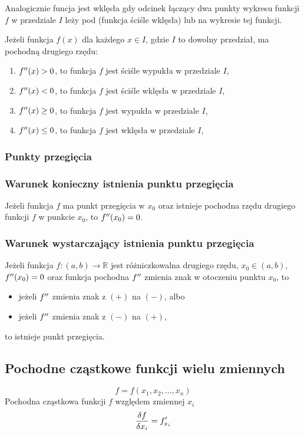 \documentclass[../Matematyka.tex]{subfiles}
\begin{document}
    Analogicznie funcja jest wklęsła gdy odcinek łączący dwa punkty wykresu funkcji \(f\) w przedziale \(I\) leży pod (funkcja ściśle wklęsła) lub na wykresie tej funkcji.

    Jeżeli funkcja \(f(x)\) dla każdego \(x \in I\), gdzie \(I\) to dowolny przedział, ma pochodną drugiego rzędu:
    \begin{enumerate}
        \item \(f^{\prime\prime}(x) > 0\), to funkcja \(f\) jest ściśle wypukła w przedziale \(I\),
        \item \(f^{\prime\prime}(x) < 0\), to funkcja \(f\) jest ściśle wklęsła w przedziale \(I\),
        \item \(f^{\prime\prime}(x) \geq 0\), to funkcja \(f\) jest wypukła w przedziale \(I\),
        \item \(f^{\prime\prime}(x) \leq 0\), to funkcja \(f\) jest wklęsła w przedziale \(I\),
    \end{enumerate}

    \subsubsection{Punkty przegięcia}
    \subsubsection*{Warunek konieczny istnienia punktu przegięcia}
    Jeżeli funkcja \(f\) ma punkt przegięcia w \(x_0\) oraz istnieje pochodna rzędu drugiego funkcji \(f\) w punkcie \(x_0\), to \(f^{\prime\prime}(x_0) = 0\).
    \subsubsection*{Warunek wystarczający istnienia punktu przegięcia}
    Jeżeli funkcja \(f:(a, b) \rightarrow \mathbb{R}\) jest różniczkowalna drugiego rzędu, \(x_0 \in (a,b)\), \(f^{\prime\prime}(x_0) = 0\) oraz funkcja pochodna \(f^{\prime\prime}\) zmienia znak w otoczeniu punktu \(x_0\), to
    \begin{itemize}
        \item jeżeli \(f^{\prime\prime}\) zmienia znak z \((+)\) na \((-)\), albo
        \item jeżeli \(f^{\prime\prime}\) zmienia znak z \((-)\) na \((+)\),
    \end{itemize}
    to istnieje punkt przegięcia.

    \subsection{Pochodne cząstkowe funkcji wielu zmiennych}
    \[f = f(x_1, x_2, \dots, x_n)\]
    Pochodna cząstkowa funkcji \(f\) względem zmiennej \(x_i\)
    \[\frac{\delta f}{\delta x_i} = f^\prime_{x_i}\]
\end{document}
